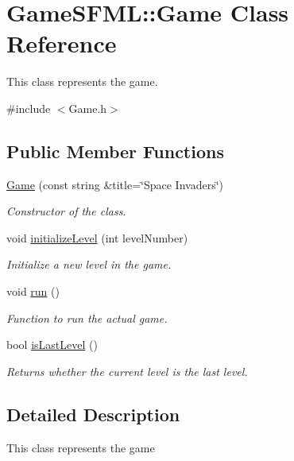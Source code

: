 \hypertarget{classGameSFML_1_1Game}{}\section{Game\+S\+F\+ML\+:\+:Game Class Reference}
\label{classGameSFML_1_1Game}


This class represents the game.  




{\ttfamily \#include $<$Game.\+h$>$}

\subsection*{Public Member Functions}
\begin{DoxyCompactItemize}
\item 
\hyperlink{classGameSFML_1_1Game_a4ae981e788669fff50422ed9a1591db4}{Game} (const string \&title=\char`\"{}Space Invaders\char`\"{})
\begin{DoxyCompactList}\small\item\em Constructor of the class. \end{DoxyCompactList}\item 
void \hyperlink{classGameSFML_1_1Game_a79da94cd442e1b622b7880fc8862ed9e}{initialize\+Level} (int level\+Number)
\begin{DoxyCompactList}\small\item\em Initialize a new level in the game. \end{DoxyCompactList}\item 
void \hyperlink{classGameSFML_1_1Game_a4a16f6dac8a77cefae6ff58622791525}{run} ()
\begin{DoxyCompactList}\small\item\em Function to run the actual game. \end{DoxyCompactList}\item 
bool \hyperlink{classGameSFML_1_1Game_aa6817ce272ba3c2007b0c5957ef69fdd}{is\+Last\+Level} ()
\begin{DoxyCompactList}\small\item\em Returns whether the current level is the last level. \end{DoxyCompactList}\end{DoxyCompactItemize}


\subsection{Detailed Description}
This class represents the game 

